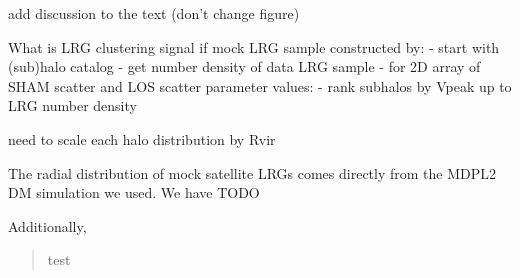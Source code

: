 \documentclass[12pt,preprint]{aastex}
\begin{document}
add discussion to the text (don't change figure)

What is LRG clustering signal if mock LRG sample constructed by:
- start with (sub)halo catalog
- get number density of data LRG sample
- for 2D array of SHAM scatter and LOS scatter parameter values:
  - rank subhalos by Vpeak up to LRG number density

\noindent {}

need to scale each halo distribution by Rvir

The radial distribution of mock satellite LRGs comes directly from the MDPL2 DM simulation we used. We have TODO

Additionally, 
\begin{quotation}
test
\end{quotation}
\end{document}
